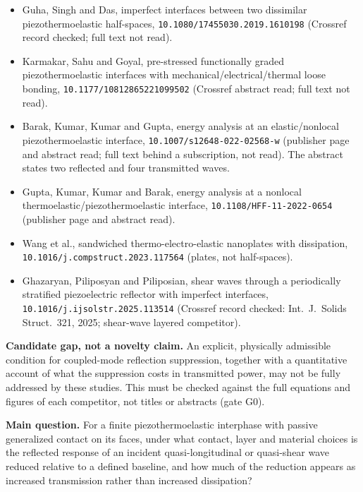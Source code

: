 \documentclass[11pt]{article}
\begin{document}
\begin{itemize}
  \item Guha, Singh and Das, imperfect interfaces between two dissimilar
    piezothermoelastic half-spaces, \texttt{10.1080/17455030.2019.1610198}
    (Crossref record checked; full text not read).
  \item Karmakar, Sahu and Goyal, pre-stressed functionally graded
    piezothermoelastic interfaces with mechanical/electrical/thermal loose
    bonding, \texttt{10.1177/10812865221099502} (Crossref abstract read; full
    text not read).
  \item Barak, Kumar, Kumar and Gupta, energy analysis at an elastic/nonlocal
    piezothermoelastic interface, \texttt{10.1007/s12648-022-02568-w} (publisher
    page and abstract read; full text behind a subscription, not read). The
    abstract states two reflected and four transmitted waves.
  \item Gupta, Kumar, Kumar and Barak, energy analysis at a nonlocal
    thermoelastic/piezothermoelastic interface,
    \texttt{10.1108/HFF-11-2022-0654} (publisher page and abstract read).
  \item Wang et al., sandwiched thermo-electro-elastic nanoplates with
    dissipation, \texttt{10.1016/j.compstruct.2023.117564} (plates, not
    half-spaces).
  \item Ghazaryan, Piliposyan and Piliposian, shear waves through a periodically
    stratified piezoelectric reflector with imperfect interfaces,
    \texttt{10.1016/j.ijsolstr.2025.113514} (Crossref record checked: Int.\ J.\
    Solids Struct.\ 321, 2025; shear-wave layered competitor).
\end{itemize}

\textbf{Candidate gap, not a novelty claim.} An explicit, physically admissible
condition for coupled-mode reflection suppression, together with a quantitative
account of what the suppression costs in transmitted power, may not be fully
addressed by these studies. This must be checked against the full equations and
figures of each competitor, not titles or abstracts (gate G0).

\textbf{Main question.} For a finite piezothermoelastic interphase with passive
generalized contact on its faces, under what contact, layer and material choices
is the reflected response of an incident quasi-longitudinal or quasi-shear wave
reduced relative to a defined baseline, and how much of the reduction appears as
increased transmission rather than increased dissipation?
\end{document}
